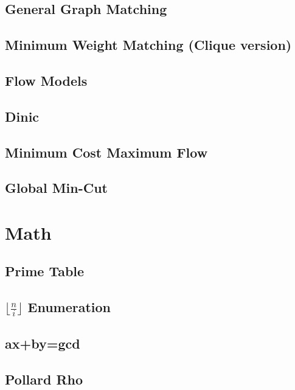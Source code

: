 \documentclass[a4paper,10pt,twocolumn,oneside]{article}
\begin{document}
\subsection{General Graph Matching}

\subsection{Minimum Weight Matching (Clique version)}

\subsection{Flow Models}

\subsection{Dinic}

\subsection{Minimum Cost Maximum Flow}

\subsection{Global Min-Cut}


\section{Math}
\subsection{Prime Table}

\subsection{$\lfloor \frac{n}{i} \rfloor$ Enumeration}

\subsection{ax+by=gcd}

\subsection{Pollard Rho}

\end{document}
